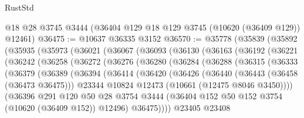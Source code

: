 \begin{lexlean}{RustStd}
\begin{coremodule}
    @18
    @28
    @3745
    @3444
    (@36404 @129 @18 @129 @3745 (@10620 (@36409 @129)) @12461)
@36475 := @10637 @36335 @3152
@36570 := @35778
    (@35839
      (@35892
        (@35935
          (@35973
            (@36021
              (@36067
                (@36093
                  (@36130
                    (@36163
                      (@36192
                        (@36221
                          (@36242
                            (@36258
                              (@36272
                                (@36276
                                  (@36280
                                    (@36284
                                      (@36288
                                        (@36315
                                          (@36333
                                            (@36379
                                              (@36389
                                                (@36394
                                                  (@36414
                                                    (@36420
                                                      (@36426
                                                        (@36440
                                                          (@36443 (@36458 (@36473 @36475)))
                                                          @23344
                                                          @10824
                                                          @12473
                                                          (@10661 (@12475 @8046 @3450))))
                                                      (@36396
                                                        @291
                                                        @120
                                                        @50
                                                        @28
                                                        @3754
                                                        @3444
                                                        (@36404
                                                          @152
                                                          @50
                                                          @152
                                                          @3754
                                                          (@10620 (@36409 @152))
                                                          @12496)
                                                        @36475))))
                                                @23405
                                                @23408

\end{coremodule}
\end{lexlean}
